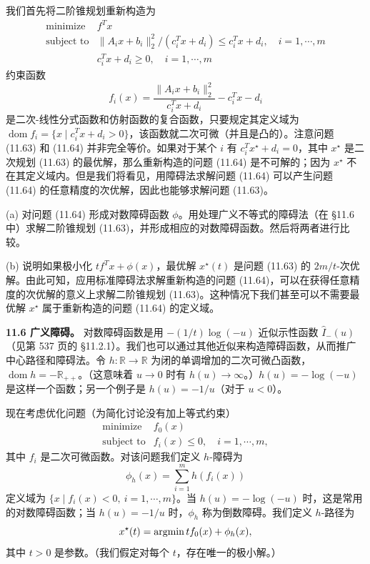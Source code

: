 \documentclass[UTF8,12pt,a4paper,fontset=fandol]{ctexart}
\begin{document}
我们首先将二阶锥规划重新构造为
\begin{equation}
\begin{array}{ll}
\text{minimize} & f^Tx\\
\text{subject to} & \|A_ix+b_i\|_2^2/(c_i^Tx+d_i)\leq c_i^Tx+d_i,\quad i=1,\cdots,m\\
& c_i^Tx+d_i\geq 0,\quad i=1,\cdots,m
\end{array}
\tag{11.64}
\end{equation}
约束函数
\[
f_i(x)=\frac{\|A_ix+b_i\|_2^2}{c_i^Tx+d_i}-c_i^Tx-d_i
\]
是二次-线性分式函数和仿射函数的复合函数，只要规定其定义域为 $\operatorname{dom} f_i=\{x\mid c_i^Tx+d_i>0\}$，该函数就二次可微（并且是凸的）。注意问题 (11.63) 和 (11.64) 并非完全等价。如果对于某个 $i$ 有 $c_i^Tx^\star+d_i=0$，其中 $x^\star$ 是二次规划 (11.63) 的最优解，那么重新构造的问题 (11.64) 是不可解的；因为 $x^\star$ 不在其定义域内。但是我们将看见，用障碍法求解问题 (11.64) 可以产生问题 (11.64) 的任意精度的次优解，因此也能够求解问题 (11.63)。

(a) 对问题 (11.64) 形成对数障碍函数 $\phi$。用处理广义不等式的障碍法（在 \S11.6 中）求解二阶锥规划 (11.63)，并形成相应的对数障碍函数。然后将两者进行比较。

(b) 说明如果极小化 $tf^Tx+\phi(x)$，最优解 $x^\star(t)$ 是问题 (11.63) 的 $2m/t$-次优解。由此可知，应用标准障碍法求解重新构造的问题 (11.64)，可以在获得任意精度的次优解的意义上求解二阶锥规划 (11.63)。这种情况下我们甚至可以不需要最优解 $x^\star$ 属于重新构造的问题 (11.64) 的定义域。

\noindent\textbf{11.6 广义障碍。} 对数障碍函数是用 $-(1/t)\log(-u)$ 近似示性函数 $\hat{I}_-(u)$（见第 537 页的 \S11.2.1）。我们也可以通过其他近似来构造障碍函数，从而推广中心路径和障碍法。令 $h:\mathbb{R}\to\mathbb{R}$ 为闭的单调增加的二次可微凸函数，$\operatorname{dom}h=-\mathbb{R}_{++}$。（这意味着 $u\to 0$ 时有 $h(u)\to\infty$。）$h(u)=-\log(-u)$ 是这样一个函数；另一个例子是 $h(u)=-1/u$（对于 $u<0$）。

现在考虑优化问题（为简化讨论没有加上等式约束）
\[
\begin{array}{ll}
\text{minimize} & f_0(x)\\
\text{subject to} & f_i(x)\leq 0,\quad i=1,\cdots,m,
\end{array}
\]
其中 $f_i$ 是二次可微函数。对该问题我们定义 $h$-障碍为
\[
\phi_h(x)=\sum_{i=1}^m h(f_i(x))
\]
定义域为 $\{x\mid f_i(x)<0,\ i=1,\cdots,m\}$。当 $h(u)=-\log(-u)$ 时，这是常用的对数障碍函数；当 $h(u)=-1/u$ 时，$\phi_h$ 称为倒数障碍。我们定义 $h$-路径为
\[
x^\star(t)=\mathop{\rm argmin} tf_0(x)+\phi_h(x),
\]
其中 $t>0$ 是参数。（我们假定对每个 $t$，存在唯一的极小解。）
\end{document}
